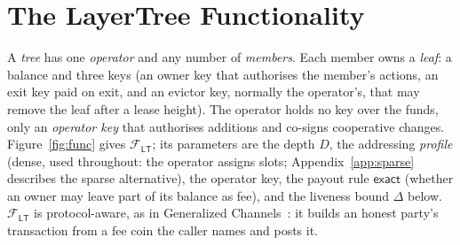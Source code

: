 \documentclass[runningheads]{llncs}
\newcommand{\Ftree}{\ensuremath{\mathcal{F}_{\mathsf{LT}}}}
\newcommand{\lat}{\ensuremath{\Delta}}
\begin{document}
\section{The LayerTree Functionality}\label{sec:func}\label{sec:model}

A \emph{tree} has one \emph{operator} and any number of \emph{members}.
Each member owns a \emph{leaf}: a balance and three keys (an owner key
that authorises the member's actions, an exit key paid on exit, and an
evictor key, normally the operator's, that may remove the leaf after a
lease height). The operator holds no key over the funds, only an
\emph{operator key} that authorises additions and co-signs cooperative
changes. Figure~\ref{fig:func} gives $\Ftree$; its parameters are the
depth $D$, the addressing \emph{profile} (dense, used throughout: the operator
assigns slots; Appendix~\ref{app:sparse} describes the sparse alternative), the
operator key, the payout rule $\mathsf{exact}$ (whether an owner may leave
part of its balance as fee), and the liveness bound $\lat$ below.
$\Ftree$ is protocol-aware, as in Generalized
Channels~\cite{genchannels}: it builds an honest party's transaction from
a fee coin the caller names and posts it.
\end{document}

